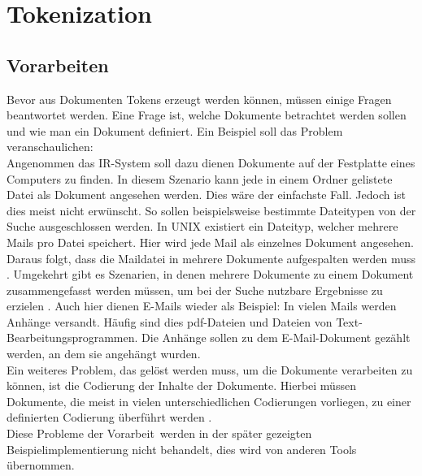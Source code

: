 \section{Tokenization}\label{token}
\subsection{Vorarbeiten}
Bevor aus Dokumenten Tokens erzeugt werden können, müssen einige Fragen beantwortet werden.
Eine Frage ist, welche Dokumente betrachtet werden sollen und wie man ein Dokument definiert. Ein Beispiel soll das Problem veranschaulichen:
\\
Angenommen das IR-System soll dazu dienen Dokumente auf der Festplatte eines Computers zu finden. In diesem Szenario kann jede in einem Ordner gelistete Datei als Dokument angesehen werden. Dies wäre der einfachste Fall. Jedoch ist dies meist nicht erwünscht. So sollen beispielsweise bestimmte Dateitypen von der Suche ausgeschlossen werden. In UNIX existiert ein Dateityp, welcher mehrere Mails pro Datei speichert. Hier wird jede Mail als einzelnes Dokument angesehen. Daraus folgt, dass die Maildatei in mehrere Dokumente aufgespalten werden muss \cite{IR_Intro_Cambridge}.
Umgekehrt gibt es Szenarien, in denen mehrere Dokumente zu einem Dokument zusammengefasst werden müssen, um bei der Suche nutzbare Ergebnisse zu erzielen \cite{IR_Intro_Cambridge}. Auch hier dienen E-Mails wieder als Beispiel: In vielen Mails werden Anhänge versandt. Häufig sind dies pdf-Dateien und Dateien von Text-Bearbeitungsprogrammen. Die Anhänge sollen zu dem E-Mail-Dokument gezählt werden, an dem sie angehängt wurden.
\\
Ein weiteres Problem, das gelöst werden muss, um die Dokumente verarbeiten zu können, ist die Codierung der Inhalte der Dokumente. Hierbei müssen Dokumente, die meist in vielen unterschiedlichen Codierungen vorliegen, zu einer definierten Codierung überführt werden \cite{IR_Intro_Cambridge}.
\\
Diese Probleme der \glqq Vorarbeit\grqq\ werden in der später gezeigten Beispielimplementierung nicht behandelt, dies wird von anderen Tools übernommen.


